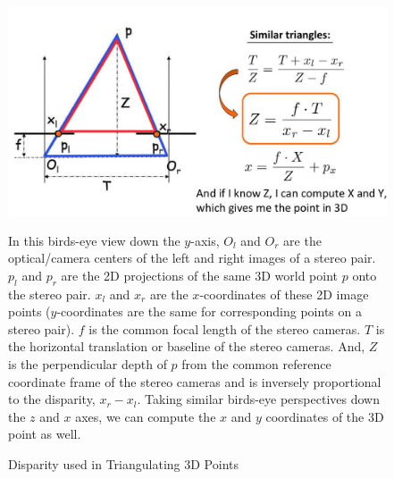 \begin{figure}[!h]
    \includegraphics[width=1\columnwidth]{figures/disparity-triangulation.png}
    \caption{Disparity used in Triangulating 3D Points~\cite{fidler_depth_2021}}
    \label{fig:disparity-triangulation}
    {\small In this birds-eye view down the $y$-axis, $O_l$ and $O_r$ are the optical/camera centers of the left and right images of a stereo pair. $p_l$ and $p_r$ are the 2D projections of the same 3D world point $p$ onto the stereo pair. $x_l$ and $x_r$ are the $x$-coordinates of these 2D image points ($y$-coordinates are the same for corresponding points on a stereo pair). $f$ is the common focal length of the stereo cameras. $T$ is the horizontal translation or baseline of the stereo cameras. And, $Z$ is the perpendicular depth of $p$ from the common reference coordinate frame of the stereo cameras and is inversely proportional to the disparity, $x_r - x_l$. Taking similar birds-eye perspectives down the $z$ and $x$ axes, we can compute the $x$ and $y$ coordinates of the 3D point as well.}
\end{figure}

